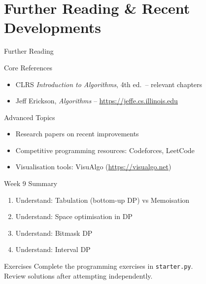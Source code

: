 \documentclass[aspectratio=169,xcolor=dvipsnames]{beamer}
\begin{document}
\section{Further Reading \& Recent Developments}
\begin{frame}{Further Reading}
  \begin{block}{Core References}
    \begin{itemize}
      \item CLRS \textit{Introduction to Algorithms}, 4th ed.\ -- relevant chapters
      \item Jeff Erickson, \textit{Algorithms} -- \url{https://jeffe.cs.illinois.edu}
    \end{itemize}
  \end{block}
  \begin{exampleblock}{Advanced Topics}
    \begin{itemize}
      \item Research papers on recent improvements
      \item Competitive programming resources: Codeforces, LeetCode
      \item Visualisation tools: VisuAlgo (\url{https://visualgo.net})
    \end{itemize}
  \end{exampleblock}
\end{frame}

\begin{frame}{Week 9 Summary}
  \begin{enumerate}
    \item Understand: Tabulation (bottom-up DP) vs Memoisation
    \item Understand: Space optimisation in DP
    \item Understand: Bitmask DP
    \item Understand: Interval DP
  \end{enumerate}
  \begin{block}{Exercises}
    Complete the programming exercises in \texttt{starter.py}.\\
    Review solutions after attempting independently.
  \end{block}
\end{frame}
\end{document}
